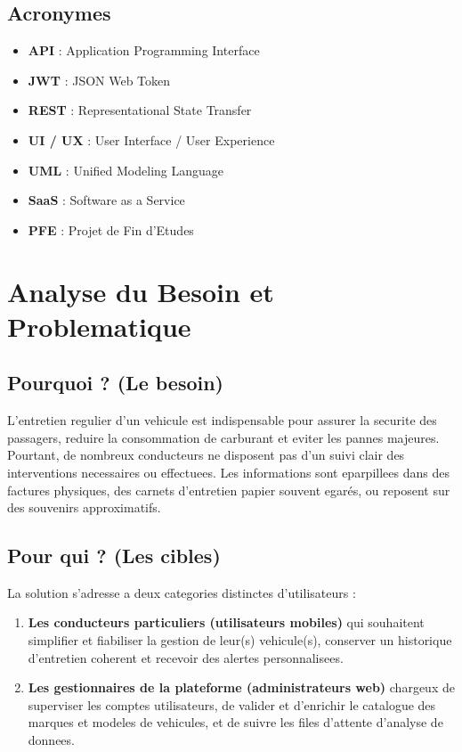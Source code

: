 \documentclass[11pt,a4paper]{report}
\begin{document}
\section{Acronymes}
\begin{itemize}[label=\textbullet]
    \item \textbf{API} : Application Programming Interface
    \item \textbf{JWT} : JSON Web Token
    \item \textbf{REST} : Representational State Transfer
    \item \textbf{UI / UX} : User Interface / User Experience
    \item \textbf{UML} : Unified Modeling Language
    \item \textbf{SaaS} : Software as a Service
    \item \textbf{PFE} : Projet de Fin d'Etudes
\end{itemize}

\chapter{Analyse du Besoin et Problematique}

\section{Pourquoi ? (Le besoin)}
L'entretien regulier d'un vehicule est indispensable pour assurer la securite des passagers, reduire la consommation de carburant et eviter les pannes majeures. Pourtant, de nombreux conducteurs ne disposent pas d'un suivi clair des interventions necessaires ou effectuees. Les informations sont eparpillees dans des factures physiques, des carnets d'entretien papier souvent egarés, ou reposent sur des souvenirs approximatifs.

\section{Pour qui ? (Les cibles)}
La solution s'adresse a deux categories distinctes d'utilisateurs :
\begin{enumerate}
    \item \textbf{Les conducteurs particuliers (utilisateurs mobiles)} qui souhaitent simplifier et fiabiliser la gestion de leur(s) vehicule(s), conserver un historique d'entretien coherent et recevoir des alertes personnalisees.
    \item \textbf{Les gestionnaires de la plateforme (administrateurs web)} chargeux de superviser les comptes utilisateurs, de valider et d'enrichir le catalogue des marques et modeles de vehicules, et de suivre les files d'attente d'analyse de donnees.
\end{enumerate}
\end{document}
